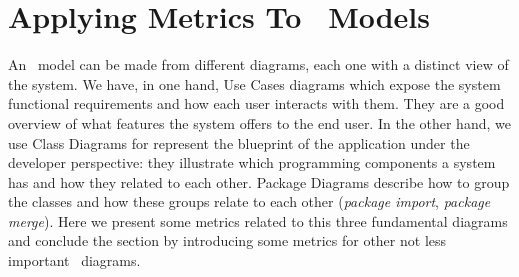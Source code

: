 \section{Applying Metrics To \uml\ Models}\label{metrics}

An \uml\ model can be made from different diagrams, each one with a distinct view of the system.
We have, in one hand, Use Cases diagrams which expose the system functional requirements and how each user interacts with them. They are a good overview of what features the system offers to the end user.
In the other hand, we use Class Diagrams for represent the blueprint of the application under the developer perspective: they illustrate which programming components a system has and how they related to each other.
Package Diagrams describe how to group the classes and how these groups relate to each other (\textit{package import}, \textit{package merge}).
Here we present some metrics related to this three fundamental diagrams and conclude the section by introducing some metrics for other not less important \uml\ diagrams.

